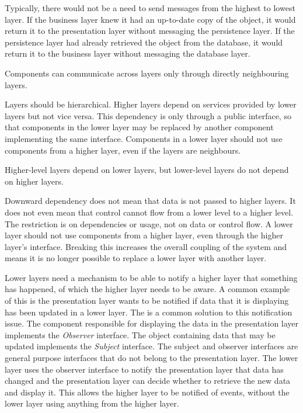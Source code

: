 Typically, there would not be a need to send messages from the highest to lowest layer.
If the business layer knew it had an up-to-date copy of the object, it would return it to the presentation layer without messaging the persistence layer.
If the persistence layer had already retrieved the object from the database, it would return it to the business layer without messaging the database layer.

\begin{definition}
    Components can communicate across layers only through directly neighbouring layers.
\end{definition}

Layers should be hierarchical. Higher layers depend on services provided by lower layers but not vice versa.
This dependency is only through a public interface, so that components in the lower layer may be replaced by another component implementing the same interface.
Components in a lower layer should not use components from a higher layer, even if the layers are neighbours.

\begin{definition}
    Higher-level layers depend on lower layers, but lower-level layers do not depend on higher layers.
\end{definition}

Downward dependency does not mean that data is not passed to higher layers.
It does not even mean that control cannot flow from a lower level to a higher level.
The restriction is on dependencies or usage, not on data or control flow.
A lower layer should not use components from a higher layer, even through the higher layer's interface.
Breaking this increases the overall coupling of the system and means it is no longer possible to replace a lower layer with another layer.

Lower layers need a mechanism to be able to notify a higher layer that something has happened, of which the higher layer needs to be aware.
A common example of this is the presentation layer wants to be notified if data that it is displaying has been updated in a lower layer.
The  is a common solution to this notification issue.
The component responsible for displaying the data in the presentation layer implements the \emph{Observer} interface.
The object containing data that may be updated implements the \emph{Subject} interface.
The subject and observer interfaces are general purpose interfaces that do not belong to the presentation layer.
The lower layer uses the observer interface to notify the presentation layer that data has changed and
the presentation layer can decide whether to retrieve the new data and display it.
This allows the higher layer to be notified of events, without the lower layer using anything from the higher layer.

